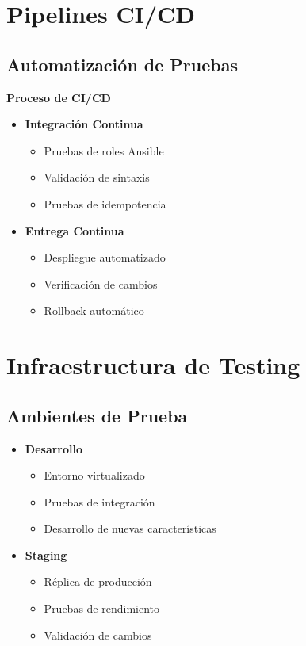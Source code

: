\section{Pipelines CI/CD}
\subsection{Automatización de Pruebas}
\begin{infocaja}
\textbf{Proceso de CI/CD}
\begin{itemize}
    \item \textbf{Integración Continua}
    \begin{itemize}
        \item Pruebas de roles Ansible
        \item Validación de sintaxis
        \item Pruebas de idempotencia
    \end{itemize}
    \item \textbf{Entrega Continua}
    \begin{itemize}
        \item Despliegue automatizado
        \item Verificación de cambios
        \item Rollback automático
    \end{itemize}
\end{itemize}
\end{infocaja}

\section{Infraestructura de Testing}
\subsection{Ambientes de Prueba}
\begin{itemize}
    \item \textbf{Desarrollo}
    \begin{itemize}
        \item Entorno virtualizado
        \item Pruebas de integración
        \item Desarrollo de nuevas características
    \end{itemize}
    \item \textbf{Staging}
    \begin{itemize}
        \item Réplica de producción
        \item Pruebas de rendimiento
        \item Validación de cambios
    \end{itemize}
\end{itemize}

